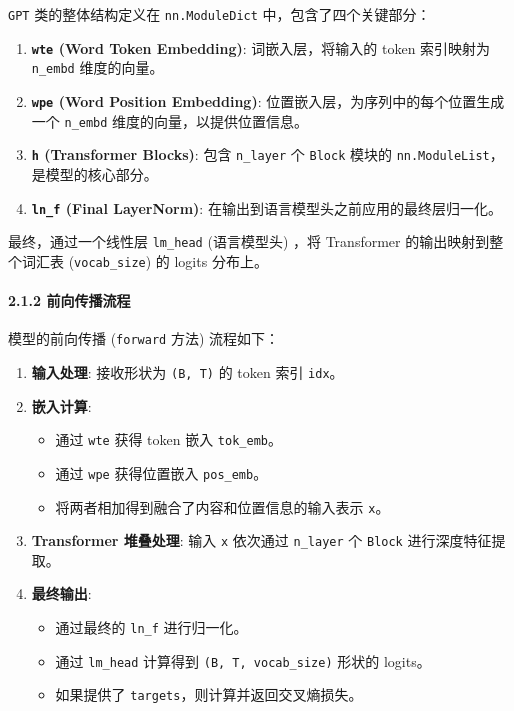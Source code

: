 \documentclass[a4paper]{article}
\providecommand{\tightlist}{%
  \setlength{\itemsep}{0pt}\setlength{\parskip}{0pt}}
\begin{document}
\texttt{GPT} 类的整体结构定义在 \texttt{nn.ModuleDict}
中，包含了四个关键部分：

\begin{enumerate}
\def\labelenumi{\arabic{enumi}.}
\tightlist
\item
  \textbf{\texttt{wte} (Word Token Embedding)}: 词嵌入层，将输入的 token
  索引映射为 \texttt{n\_embd} 维度的向量。
\item
  \textbf{\texttt{wpe} (Word Position Embedding)}:
  位置嵌入层，为序列中的每个位置生成一个 \texttt{n\_embd}
  维度的向量，以提供位置信息。
\item
  \textbf{\texttt{h} (Transformer Blocks)}: 包含 \texttt{n\_layer} 个
  \texttt{Block} 模块的 \texttt{nn.ModuleList}，是模型的核心部分。
\item
  \textbf{\texttt{ln\_f} (Final LayerNorm)}:
  在输出到语言模型头之前应用的最终层归一化。
\end{enumerate}

最终，通过一个线性层 \texttt{lm\_head} (语言模型头) ，将 Transformer
的输出映射到整个词汇表 (\texttt{vocab\_size}) 的 logits 分布上。

\paragraph{2.1.2
前向传播流程}\label{ux524dux5411ux4f20ux64adux6d41ux7a0b}

模型的前向传播 (\texttt{forward} 方法) 流程如下：

\begin{enumerate}
\def\labelenumi{\arabic{enumi}.}
\tightlist
\item
  \textbf{输入处理}: 接收形状为 \texttt{(B,\ T)} 的 token 索引
  \texttt{idx}。
\item
  \textbf{嵌入计算}:

  \begin{itemize}
  \tightlist
  \item
    通过 \texttt{wte} 获得 token 嵌入 \texttt{tok\_emb}。
  \item
    通过 \texttt{wpe} 获得位置嵌入 \texttt{pos\_emb}。
  \item
    将两者相加得到融合了内容和位置信息的输入表示 \texttt{x}。
  \end{itemize}
\item
  \textbf{Transformer 堆叠处理}: 输入 \texttt{x} 依次通过
  \texttt{n\_layer} 个 \texttt{Block} 进行深度特征提取。
\item
  \textbf{最终输出}:

  \begin{itemize}
  \tightlist
  \item
    通过最终的 \texttt{ln\_f} 进行归一化。
  \item
    通过 \texttt{lm\_head} 计算得到 \texttt{(B,\ T,\ vocab\_size)}
    形状的 logits。
  \item
    如果提供了 \texttt{targets}，则计算并返回交叉熵损失。
  \end{itemize}
\end{enumerate}
\end{document}
